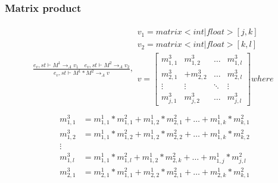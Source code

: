 \subsubsection{Matrix product}
\begin{minipage}{1.0\textwidth}
\begin{equation}
\begin{aligned}
	\frac { { e }_{ v },st\vdash { M }^{ 1 }{ \rightarrow  }_{ A }{ v }_{ 1 }\quad { e }_{ v },st\vdash { M }^{ 2 }{ \rightarrow  }_{ A }{ v }_{ 2 } }{ { e }_{ v },st\vdash { M }^{ 1 }*{ M }^{ 2 }{ \rightarrow  }_{ A }{ v } } ,\begin{matrix} { v }_{ 1 }=matrix<int|float>[j,k] \\ { v }_{ 2 }=matrix<int|float>[k,l] \\
	 v=\begin{bmatrix} { { m }_{ 1,1 }^{ 3 } } & { { m }_{ 1,2 }^{ 3 } } & \dots  & { m }_{ 1,l }^{ 3 }\\
{ { m }_{ 2,1 }^{ 3 } } &   +{ { m }_{ 2,2 }^{ 3 } } & \dots & { { m }_{ 2,l }^{ 3 } }
\\ \vdots  & \vdots & \ddots  & \vdots  \\
 { m }_{ j,1 }^{ 3 }& { { m }_{ j,2 }^{ 3 } } & \dots & { m }_{ j,l }^{ 3 } \end{bmatrix} where
\\ \end{matrix}
\end{aligned}
\end{equation}
\begin{equation*}
\begin{aligned}
{ { m }_{ 1,1 }^{ 3 } }  &= { { m }_{ 1,1 }^{ 1 } } *{ { m }_{ 1,1 }^{ 2 } }+ { { m }_{ 1,2 }^{ 1 } } *{ { m }_{ 2,1 }^{ 2 } }+\dots+ { { m }_{ 1,k }^{ 1 } } *{ { m }_{ k,1 }^{ 2 } }\\
{ { m }_{ 1,2 }^{ 3 } }  &= { { m }_{ 1,1 }^{ 1 } } *{ { m }_{ 1,2 }^{ 2 } }+ { { m }_{ 1,2 }^{ 1 } } *{ { m }_{ 2,2 }^{ 2 } }+\dots+ { { m }_{ 1,k }^{ 1 } } *{ { m }_{ k,2 }^{ 2 } }\\
\vdots\\
{ { m }_{ 1,l }^{ 3 } }  &= { { m }_{ 1,1 }^{ 1 } } *{ { m }_{ 1,l }^{ 2 } }+ { { m }_{ 1,2 }^{ 1 } } *{ { m }_{ 2,k }^{ 2 } }+\dots+ { { m }_{ 1,j }^{ 1 } } *{ { m }_{ j,l }^{ 2 } }\\
{ { m }_{ 2,1 }^{ 3 } }  &= { { m }_{ 2,1 }^{ 1 } } *{ { m }_{ 1,1 }^{ 2 } }+ { { m }_{ 2,2 }^{ 1 } } *{ { m }_{ 2,1 }^{ 2 } }+\dots+ { { m }_{ 2,k }^{ 1 } } *{ { m }_{ k,1 }^{ 2 } }\\

\end{aligned}
\end{equation*}
\end{minipage}

